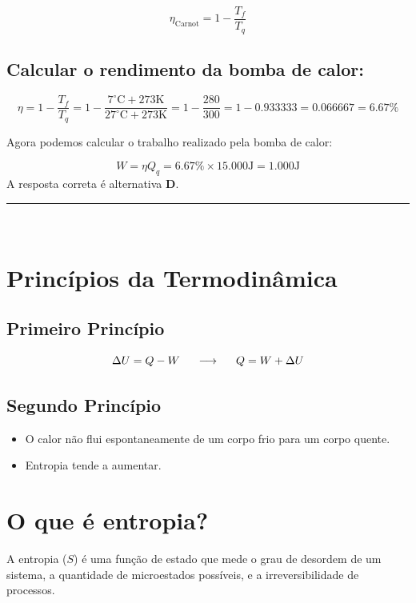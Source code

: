 \documentclass[a4paper,12pt]{article}
\begin{document}
\begin{flushleft}
\[
\eta_{\text{Carnot}} = 1 - \frac{T_f}{T_q}
\]

\subsection*{Calcular o rendimento da bomba de calor:}

\[
\eta = 1 - \frac{T_f}{T_q} = 1 - \frac{7^{\circ}\textrm{C} + 273\textrm{K}}{27^{\circ}\textrm{C}+ 273\textrm{K}} = 1 - \frac{280}{300} = 1 - 0.933333 = 0.066667 = 6.67\%
\]

Agora podemos calcular o trabalho realizado pela bomba de calor:

\[
  W = \eta Q_q = 6.67\% \times 15.000 \textrm{J} = 1.000 \textrm{J}
\]
A resposta correta é alternativa \colorbox{green!50}{\textbf{D}}.
\end{flushleft}

\noindent\rule{\linewidth}{0.6pt}\\

\section*{Princ\'ipios da Termodinâmica}

\subsection*{Primeiro Princípio}
\begin{equation*}
    \Delta U = Q - W   \hspace{0.5cm} \longrightarrow \hspace{0.5cm} Q = W + \Delta U
\end{equation*}
\subsection*{Segundo Princípio}
\begin{itemize}
    \item O calor não flui espontaneamente de um corpo frio para um corpo quente.
    \item Entropia tende a aumentar.
\end{itemize}

\section*{O que é entropia?}
A entropia (\(S\)) é uma função de estado que mede o grau de desordem de um sistema, a quantidade de microestados possíveis, e a irreversibilidade de processos.
\end{document}
